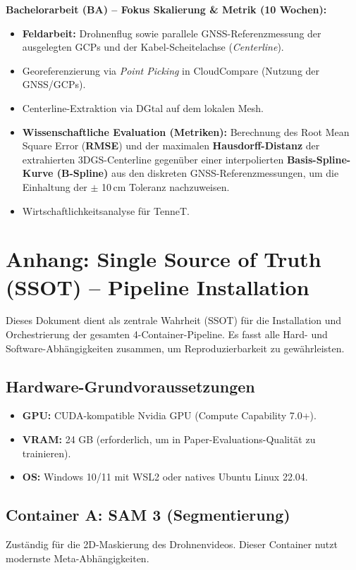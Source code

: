\documentclass[12pt,a4paper]{article}
\begin{document}
\vspace{0.3cm}
\noindent\textbf{Bachelorarbeit (BA) -- Fokus Skalierung \& Metrik (10 Wochen):}
\begin{itemize}[noitemsep]
    \item \textbf{Feldarbeit:} Drohnenflug sowie parallele GNSS-Referenzmessung der ausgelegten GCPs und der Kabel-Scheitelachse (\textit{Centerline}).
    \item Georeferenzierung via \textit{Point Picking} in CloudCompare (Nutzung der GNSS/GCPs).
    \item Centerline-Extraktion via DGtal auf dem lokalen Mesh.
    \item \textbf{Wissenschaftliche Evaluation (Metriken):} Berechnung des Root Mean Square Error (\textbf{RMSE}) und der maximalen \textbf{Hausdorff-Distanz} der extrahierten 3DGS-Centerline gegenüber einer interpolierten \textbf{Basis-Spline-Kurve (B-Spline)} aus den diskreten GNSS-Referenzmessungen, um die Einhaltung der $\pm$ 10\,cm Toleranz nachzuweisen.
    \item Wirtschaftlichkeitsanalyse für TenneT.
\end{itemize}

\section{Anhang: Single Source of Truth (SSOT) -- Pipeline Installation}
Dieses Dokument dient als zentrale Wahrheit (SSOT) für die Installation und Orchestrierung der gesamten 4-Container-Pipeline. Es fasst alle Hard- und Software-Abhängigkeiten zusammen, um Reproduzierbarkeit zu gewährleisten.

\subsection*{Hardware-Grundvoraussetzungen}
\begin{itemize}[noitemsep]
    \item \textbf{GPU:} CUDA-kompatible Nvidia GPU (Compute Capability 7.0+).
    \item \textbf{VRAM:} 24 GB (erforderlich, um in Paper-Evaluations-Qualität zu trainieren).
    \item \textbf{OS:} Windows 10/11 mit WSL2 oder natives Ubuntu Linux 22.04.
\end{itemize}

\subsection*{Container A: SAM 3 (Segmentierung)}
Zuständig für die 2D-Maskierung des Drohnenvideos. Dieser Container nutzt modernste Meta-Abhängigkeiten.
\end{document}
